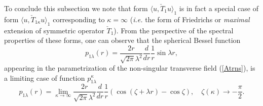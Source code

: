 \documentclass[12pt]{article}
\begin{document}
	To conclude this subsection we note that form
$ \langle u, \check{T}_{1} u\rangle_{1} $
	is in fact a special case of form
$ \langle u, \check{T}_{1\kappa} u\rangle_{1} $
	corresponding to
$ \kappa = \infty $
    ({\it i.e.} the form of Friedrichs or \emph{maximal} extension
    of symmetric operator
$ \check{T}_{1} $).
	From the perspective of the spectral properties of these forms,
	one can observe that the spherical Bessel function
\begin{equation*}
    p_{1\lambda}(r) = \frac{2r}{\sqrt{2\pi}\lambda^{2}}
	\frac{d}{dr}\frac{1}{r} \sin \lambda r ,
\end{equation*}
	appearing in the parametrization of the non-singular transverse field
(\ref{Atrns}),
	is a limiting case of function
$ p_{1\lambda}^{\kappa} $
\begin{equation*}
    p_{1\lambda}(r)  
        = \lim_{\kappa\to\infty}
    \frac{2r}{\sqrt{2\pi}\lambda^{2}} \frac{d}{dr}\frac{1}{r}
    (\cos(\zeta +\lambda r) - \cos\zeta) ,\quad \zeta(\kappa)\to -\frac{\pi}{2}.
\end{equation*}

%
%
\end{document}
